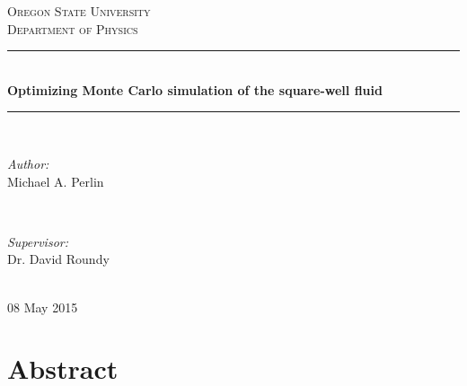 \documentclass[11pt]{article}
\renewcommand{\title}{Optimizing Monte Carlo simulation of the
  square-well fluid}
\renewcommand{\author}{Michael A. Perlin}
\newcommand{\institution}{Oregon State University}
\newcommand{\department}{Department of Physics}
\newcommand{\supervisor}{Dr. David Roundy}
\renewcommand{\date}{08 May 2015}
\begin{document}
\begin{titlepage}

  \newcommand{\HRule}{\rule{\linewidth}{0.5mm}}

  \center

  \textsc{\LARGE \institution}\\[1.5cm]
  \textsc{\Large \department}\\[0.5cm]

  \HRule \\[0.4cm]
  { \huge \bfseries \title}\\[0.4cm]
  \HRule \\[1.5cm]

  \begin{minipage}{0.4\textwidth}
    \begin{flushleft} \large
      \emph{Author:}\\
      \author
    \end{flushleft}
  \end{minipage}
  ~
  \begin{minipage}{0.4\textwidth}
    \begin{flushright} \large
      \emph{Supervisor:} \\
      \supervisor
    \end{flushright}
  \end{minipage}\\[4cm]

  {\large\date}

  \vfill

\end{titlepage}

\thispagestyle{empty}

\newpage

\tableofcontents

\thispagestyle{empty}

\newpage



\thispagestyle{empty}

\newpage

\setcounter{page}{1}


\section*{Abstract}
\label{sec:abstract}
\end{document}
